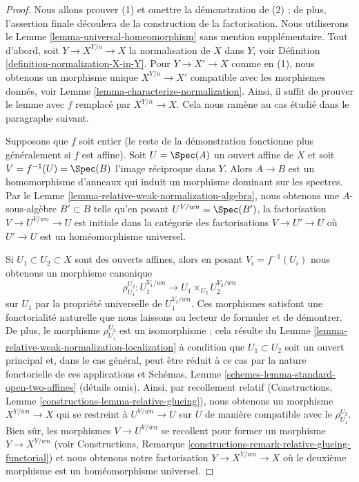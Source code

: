 \begin{proof}
Nous allons prouver (1) et omettre la démonstration de (2) ; de plus,
l'assertion finale découlera de la construction de la factorisation.
Nous utiliserons le Lemme \ref{lemma-universal-homeomorphism}
sans mention supplémentaire. Tout d'abord, soit $Y \to X^{Y/n} \to X$ la normalisation
de $X$ dans $Y$, voir Définition \ref{definition-normalization-X-in-Y}.
Pour $Y \to X' \to X$ comme en (1), nous obtenons un morphisme
unique $X^{Y/n} \to X'$ compatible avec les morphismes donnés,
voir Lemme \ref{lemma-characterize-normalization}. Ainsi, il suffit de prouver le
lemme avec $f$ remplacé par $X^{Y/n} \to X$. Cela nous ramène
au cas étudié dans le paragraphe suivant.

\medskip\noindent
Supposons que $f$ soit entier (le reste de la démonstration fonctionne
plus généralement si $f$ est affine). Soit $U = \Spec(A)$
un ouvert affine de $X$ et soit $V = f^{-1}(U) = \Spec(B)$ l'image
réciproque dans $Y$. Alors $A \to B$ est un homomorphisme
d'anneaux qui induit un morphisme dominant sur les spectres. Par le
Lemme \ref{lemma-relative-weak-normalization-algebra}, nous obtenons une $A$-sous-algèbre $B' \subset B$
telle qu'en posant $U^{V/wn} = \Spec(B')$, la factorisation $V \to U^{V/wn} \to U$
est initiale dans la catégorie des factorisations $V \to U' \to U$ où $U' \to U$
est un homéomorphisme universel.

\medskip\noindent
Si $U_1 \subset U_2 \subset X$ sont des ouverts affines, alors en posant $V_i = f^{-1}(U_i)$
nous obtenons un morphisme canonique
$$
\rho_{U_1}^{U_2} : U_1^{V_1/wn} \to U_1 \times_{U_2} U_2^{V_2/wn}
$$
sur $U_1$ par la propriété universelle de $U_1^{V_1/wn}$. Ces morphismes
satisfont une fonctorialité naturelle que nous laissons au lecteur
de formuler et de démontrer. De plus,
le morphisme $\rho_{U_1}^{U_2}$ est
un isomorphisme ; cela résulte du Lemme \ref{lemma-relative-weak-normalization-localization}
à condition que $U_1 \subset U_2$ soit un ouvert
principal et, dans le cas général, peut être
réduit à ce cas par la nature fonctorielle
de ces applications et Schémas, Lemme \ref{schemes-lemma-standard-open-two-affines}
(détails omis). Ainsi, par recollement
relatif (Constructions, Lemme \ref{constructions-lemma-relative-glueing}), nous obtenons
un morphisme $X^{Y/wn} \to X$ qui se restreint
à $U^{V/wn} \to U$ sur $U$ de manière compatible avec le $\rho_{U_1}^{U_2}$.
Bien sûr, les morphismes $V \to U^{V/wn}$ se recollent pour former un
morphisme $Y \to X^{Y/wn}$ (voir
Constructions, Remarque \ref{constructions-remark-relative-glueing-functorial}) et nous obtenons
notre factorisation $Y \to X^{Y/wn} \to X$ où le deuxième morphisme est un
homéomorphisme universel.


\end{proof}
